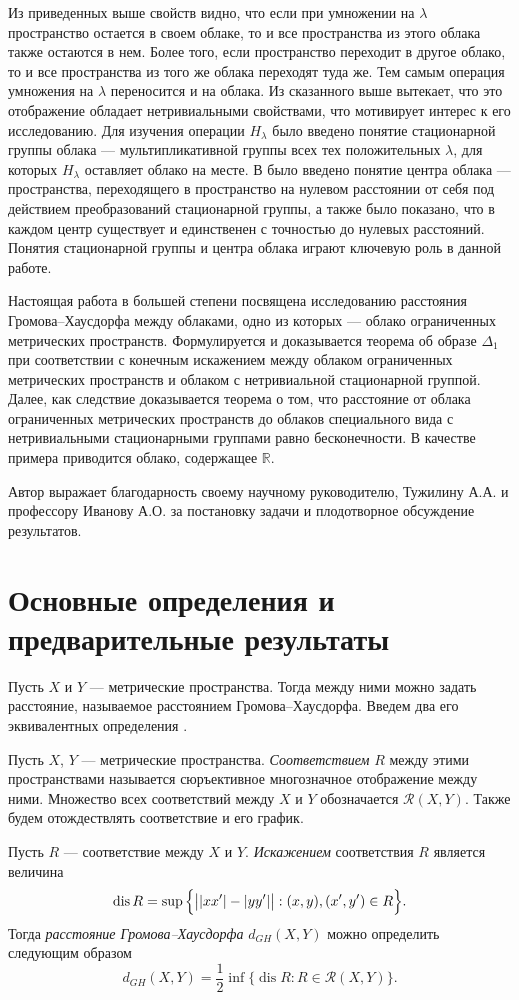 \documentclass[11pt,twoside,draft
]{article}
\DeclareMathOperator{\dis}{dis}
\begin{document}
Из приведенных выше свойств видно, что если при умножении на
$\lambda$ пространство остается в своем облаке, то и все пространства
из этого облака также остаются в нем.
Более того, если пространство переходит в другое облако, то и все
пространства из того же облака переходят туда же.
Тем самым операция умножения на $\lambda$ переносится и на облака.
Из сказанного выше вытекает, что это отображение обладает
нетривиальными свойствами, что мотивирует интерес к его исследованию.
Для изучения операции $H_\lambda$ было введено понятие стационарной
группы облака --- мультипликативной группы всех тех положительных
$\lambda$, для которых $H_\lambda$ оставляет облако на месте. В
\cite{TuzhBog2} было введено понятие центра облака --- пространства,
переходящего в пространство на нулевом расстоянии от себя под
действием преобразований стационарной группы, а также было показано,
что в каждом центр существует и единственен с точностью до нулевых
расстояний. Понятия стационарной группы и центра облака играют
ключевую роль в данной работе.

Настоящая работа в большей степени посвящена исследованию расстояния
Громова--Хаусдорфа между облаками, одно из которых --- облако
ограниченных метрических пространств. Формулируется и доказывается
теорема об образе $\Delta_1$ при соответствии с конечным искажением
между облаком ограниченных метрических пространств и облаком с
нетривиальной стационарной группой.
Далее, как следствие доказывается теорема о том, что расстояние от
облака ограниченных метрических пространств до облаков специального
вида с нетривиальными стационарными группами равно бесконечности. В
качестве примера приводится облако, содержащее $\mathbb{R}$.

Автор выражает благодарность своему научному руководителю, Тужилину
А.А. и профессору Иванову А.О. за постановку задачи и плодотворное
обсуждение результатов.


\section{Основные определения и предварительные результаты} Пусть $X$ и $Y$ ---
метрические пространства. Тогда между ними можно задать расстояние, называемое
расстоянием Громова--Хаусдорфа. Введем два его эквивалентных
определения \cite{Lectures}.
\begin{defin}
  Пусть $X$, $Y$ --- метрические пространства. \emph{Соответствием}
  $R$ между этими пространствами
  называется сюръективное многозначное отображение между ними.
  Множество всех соответствий между $X$ и $Y$ обозначается
  $\mathcal{R}(X,Y)$. Также будем отождествлять соответствие и его график.
\end{defin}
\begin{defin}
  Пусть $R$ --- соответствие между $X$ и $Y$.
  \emph{Искажением} соответствия $R$ является величина
  $$ \dis{R} = \sup{\Bigl\{ \big| |xx'| - |yy'| \big| : (x, y), (x',
  y') \in R\Bigr\}}.$$
  Тогда \emph{расстояние Громова--Хаусдорфа} $d_{GH}(X,Y)$ можно определить
  следующим образом
  $$ d_{GH}(X,Y) = \frac{1}{2}\inf \bigl\{\dis{R} : R \in
  \mathcal{R}(X,Y)\bigr\}.$$
  \label{defSootvet}
\end{defin}
\end{document}
